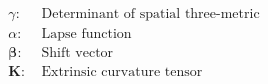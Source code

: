 \documentclass[10pt]{article}
\begin{document}
\begin{align*}\gamma:&\ \text{Determinant of spatial three-metric}\\
\alpha:&\ \text{Lapse function}\\
\boldsymbol{\beta}:&\ \text{Shift vector}\\
\boldsymbol{K}:&\ \text{Extrinsic curvature tensor}
\end{align*}
\end{document}
